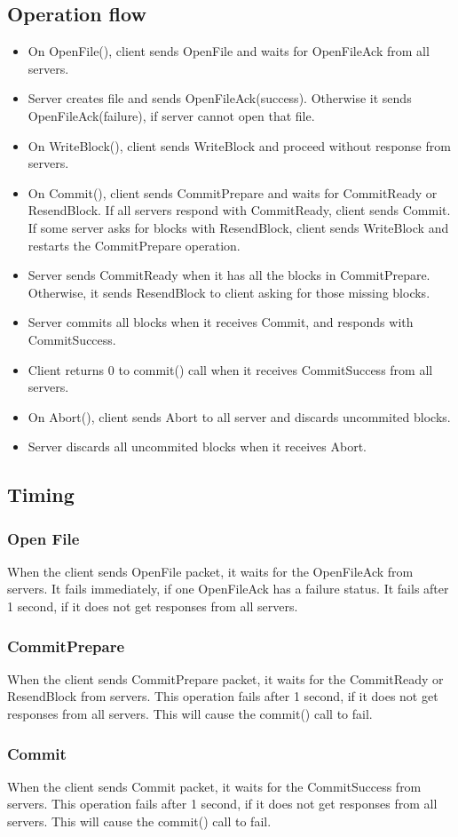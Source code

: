 \documentclass[11pt]{article} %
\begin{document}
\subsection{Operation flow}
\begin{itemize}
    \item On OpenFile(), client sends OpenFile and waits for OpenFileAck from all servers.
    \item Server creates file and sends OpenFileAck(success). 
        Otherwise it sends OpenFileAck(failure), if server cannot open that file.
    \item On WriteBlock(), client sends WriteBlock and proceed without response from servers.
    \item On Commit(), client sends CommitPrepare and waits for CommitReady or ResendBlock.
        If all servers respond with CommitReady, client sends Commit.
        If some server asks for blocks with ResendBlock, client sends WriteBlock
        and restarts the CommitPrepare operation.
    \item Server sends CommitReady when it has all the blocks in CommitPrepare.
        Otherwise, it sends ResendBlock to client asking for those missing blocks.
    \item Server commits all blocks when it receives Commit, 
        and responds with CommitSuccess.
    \item Client returns 0 to commit() call when it receives CommitSuccess from all servers.\
    \item On Abort(), client sends Abort to all server and discards uncommited blocks.
    \item Server discards all uncommited blocks when it receives Abort.
\end{itemize}

\subsection{Timing}
\subsubsection{Open File}
When the client sends OpenFile packet, it waits for the OpenFileAck from servers.
It fails immediately, if one OpenFileAck has a failure status. 
It fails after 1 second, if it does not get responses from all servers.

\subsubsection{CommitPrepare}
When the client sends CommitPrepare packet, it waits for the CommitReady 
or ResendBlock from servers.
This operation fails after 1 second, if it does not get responses from all servers.
This will cause the commit() call to fail.

\subsubsection{Commit}
When the client sends Commit packet, it waits for the CommitSuccess from servers.
This operation fails after 1 second, if it does not get responses from all servers.
This will cause the commit() call to fail.
\end{document}
